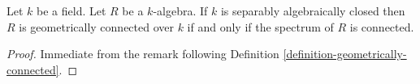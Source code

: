 \begin{lemma}
\label{lemma-separably-closed-connected-implies-geometric}
Let $k$ be a field.
Let $R$ be a $k$-algebra.
If $k$ is separably algebraically closed then $R$ is
geometrically connected over $k$ if and only if the
spectrum of $R$ is connected.
\end{lemma}

\begin{proof}
Immediate from the remark following
Definition \ref{definition-geometrically-connected}.
\end{proof}